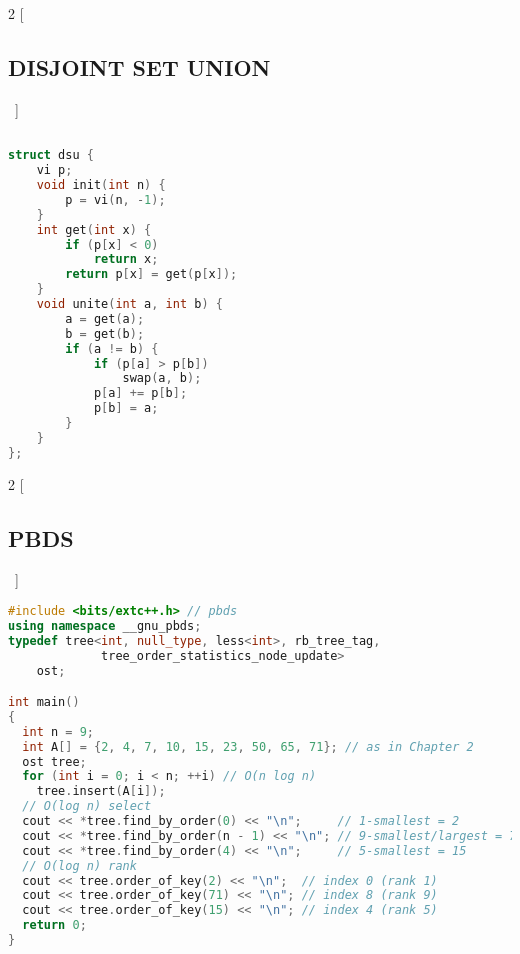 \documentclass[leter]{amsart}
\begin{document}
\begin{multicols}{2}
[\subsection{DISJOINT SET UNION}\ ]
\begin{lstlisting}[language=C++]
 
struct dsu {
    vi p;
    void init(int n) {
        p = vi(n, -1);
    }
    int get(int x) {
        if (p[x] < 0)
            return x;
        return p[x] = get(p[x]);
    }
    void unite(int a, int b) {
        a = get(a);
        b = get(b);
        if (a != b) {
            if (p[a] > p[b])
                swap(a, b);
            p[a] += p[b];
            p[b] = a;
        }
    }
};


\end{lstlisting}
\end{multicols}
\begin{multicols}{2}
[\subsection{PBDS}\ ]
\begin{lstlisting}[language=C++]
#include <bits/extc++.h> // pbds
using namespace __gnu_pbds;
typedef tree<int, null_type, less<int>, rb_tree_tag,
             tree_order_statistics_node_update>
    ost;

int main()
{
  int n = 9;
  int A[] = {2, 4, 7, 10, 15, 23, 50, 65, 71}; // as in Chapter 2
  ost tree;
  for (int i = 0; i < n; ++i) // O(n log n)
    tree.insert(A[i]);
  // O(log n) select
  cout << *tree.find_by_order(0) << "\n";     // 1-smallest = 2
  cout << *tree.find_by_order(n - 1) << "\n"; // 9-smallest/largest = 71
  cout << *tree.find_by_order(4) << "\n";     // 5-smallest = 15
  // O(log n) rank
  cout << tree.order_of_key(2) << "\n";  // index 0 (rank 1)
  cout << tree.order_of_key(71) << "\n"; // index 8 (rank 9)
  cout << tree.order_of_key(15) << "\n"; // index 4 (rank 5)
  return 0;
}


\end{lstlisting}
\end{multicols}
\end{document}
